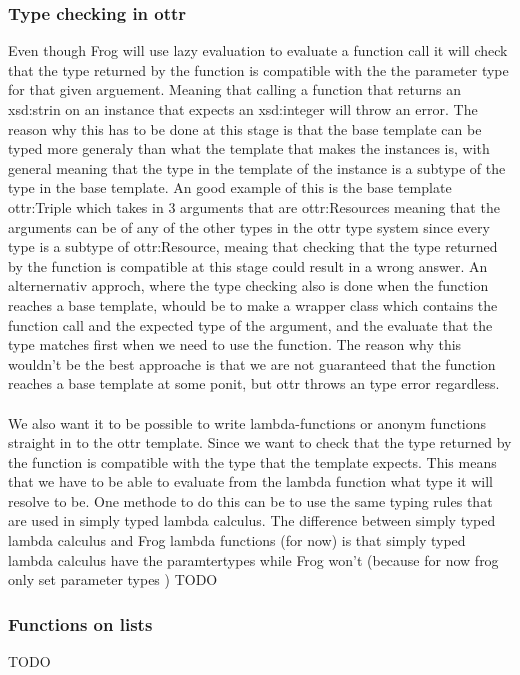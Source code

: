 \subsubsection{Type checking in ottr}
Even though Frog will use lazy evaluation to evaluate a function call it will check that the type returned by the function is compatible with 
the the parameter type for that given arguement. Meaning that calling a function that returns an xsd:strin on an instance that 
expects an xsd:integer will throw an error. The reason why this has to be done at this stage is that the base template can be typed 
more generaly than what the template that makes the instances is, with general meaning that the type in the template of the instance
is a subtype of the type in the base template. An good example of this is the base template ottr:Triple which takes in 3 arguments that 
are ottr:Resources meaning that the arguments can be of any of the other types in the ottr type system since every type is a subtype of 
ottr:Resource, meaing that checking that the type returned by the function is compatible at this stage could result in a wrong answer. 
An alternernativ approch, where the type checking also is done when the function reaches a base template, whould be to make a wrapper 
class which contains the function call and the expected type of the argument, and the evaluate that the type matches first when we need 
to use the function. The reason why this wouldn't be the best approache is that we are not guaranteed that the function reaches a 
base template at some ponit, but ottr throws an type error regardless.
\\ \\
We also want it to be possible to write lambda-functions or anonym functions straight in to the ottr template. Since we want to check that 
the type returned by the function is compatible with the type that the template expects. This means that we have to be able to evaluate from 
the lambda function what type it will resolve to be. One methode to do this can be to use the same typing rules that are used in 
simply typed lambda calculus. The difference between simply typed lambda calculus and Frog lambda functions (for now) is that simply typed 
lambda calculus have the paramtertypes while Frog won't (because for now frog only set parameter types )  TODO

\subsubsection{Functions on lists}
TODO

